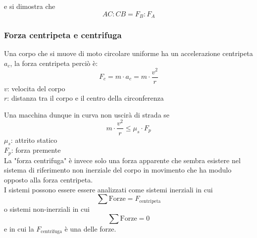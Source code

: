 e si dimostra che 
\begin{equation*}
  AC:CB=F_B:F_A
\end{equation*}

\subsubsection{Forza centripeta e centrifuga}
Una corpo che si muove di moto circolare uniforme ha un accelerazione centripeta $a_c$, la forza 
centripeta perciò è:   
\begin{equation*}
  F_c =m\cdot a_c= m\cdot\frac{v^{2}}{r}
\end{equation*}
$v$: velocita del corpo\\
$r$: distanza tra il corpo e il centro della circonferenza
\begin{center}	
\end{center}
Una macchina dunque in curva non uscirà di strada se 
\begin{equation*}
  m\cdot\frac{v^{2}}{r} \leq \mu_s\cdot F_p
\end{equation*}
$\mu_s$: attrito statico\\
$F_p$: forza premente\\ [\baselineskip]

La "forza centrifuga" è invece solo una forza apparente che sembra esistere nel sistema di 
riferimento non inerziale del corpo in movimento che ha modulo opposto alla forza centripeta.\\
I sistemi possono essere essere analizzati come sistemi inerziali in cui 
\begin{equation*}
  \sum \text{Forze}=F_{\text{centripeta}}
\end{equation*}
o sistemi non-inerziali in cui 
\begin{equation*}
  \sum \text{Forze}=0
\end{equation*}
e in cui la $F_{\text{centrifuga}}$ è una delle forze.

